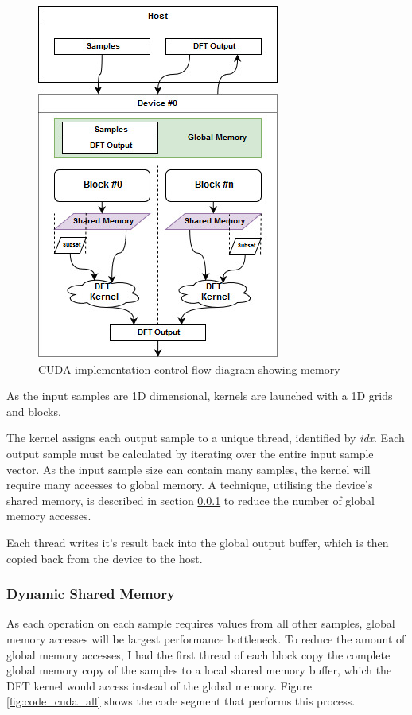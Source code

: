 \documentclass[11pt,a4paper]{article}
\begin{document}
\begin{figure}
\begin{center}
\includegraphics[scale=0.6]{cuda_impl1}
\end{center}
\caption{CUDA implementation control flow diagram showing memory }
\label{fig:cuda_impl1}
\end{figure}

As the input samples are 1D dimensional, kernels are launched with a 1D grids and blocks. 

The kernel assigns each output sample to a unique thread, identified by \textit{idx}. Each output sample must be calculated by iterating over the entire input sample vector. As the input sample size can contain many samples, the kernel will require many accesses to global memory. A technique, utilising the device's shared memory, is described in section \ref{sect:Dynamic Shared Memory} to reduce the number of global memory accesses.

Each thread writes it's result back into the global output buffer, which is then copied back from the device to the host.

\subsubsection{Dynamic Shared Memory} \label{sect:Dynamic Shared Memory}
As each operation on each sample requires values from all other samples, global memory accesses will be largest performance bottleneck. To reduce the amount of global memory accesses, I had the first thread of each block copy the complete global memory copy of the samples to a local shared memory buffer, which the DFT kernel would access instead of the global memory. Figure \ref{fig:code_cuda_all} shows the code segment that performs this process.
\end{document}
